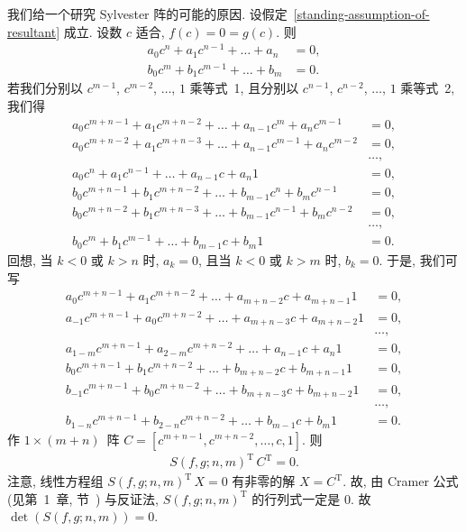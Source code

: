 \documentclass[../libro.tex]{subfiles}
\begin{document}
我们给一个研究 Sylvester 阵的可能的原因.
设假定~\ref{standing-assumption-of-resultant} 成立.
设数 \(c\) 适合, \(f(c) = 0 = g(c)\).
则
\begin{align*}
    a_0 c^n + a_1 c^{n-1} + \dots + a_n & = 0, \\
    b_0 c^m + b_1 c^{m-1} + \dots + b_m & = 0.
\end{align*}
若我们分别以 \(c^{m-1}\), \(c^{m-2}\), \(\dots\), \(1\) 乘等式~1,
且分别以 \(c^{n-1}\), \(c^{n-2}\), \(\dots\), \(1\) 乘等式~2,
我们得
\begin{align*}
    a_0 c^{m+n-1} + a_1 c^{m+n-2} + \dots + a_{n-1} c^{m} + a_n c^{m-1}   & = 0,   \\
    a_0 c^{m+n-2} + a_1 c^{m+n-3} + \dots + a_{n-1} c^{m-1} + a_n c^{m-2} & = 0,   \\
    & \dots, \\
    a_0 c^{n} + a_1 c^{n-1} + \dots + a_{n-1} c + a_n 1                   & = 0,   \\
    b_0 c^{m+n-1} + b_1 c^{m+n-2} + \dots + b_{m-1} c^{n} + b_m c^{n-1}   & = 0,   \\
    b_0 c^{m+n-2} + b_1 c^{m+n-3} + \dots + b_{m-1} c^{n-1} + b_m c^{n-2} & = 0,   \\
    & \dots, \\
    b_0 c^{m} + b_1 c^{m-1} + \dots + b_{m-1} c + b_m 1                   & = 0.
\end{align*}
回想, 当 \(k < 0\) 或 \(k > n\) 时, \(a_k = 0\),
且当 \(k < 0\) 或 \(k > m\) 时, \(b_k = 0\).
于是, 我们可写
\begin{align*}
    a_{0} c^{m+n-1} + a_{1} c^{m+n-2} + \dots + a_{m+n-2} c + a_{m+n-1} 1  & = 0,   \\
    a_{-1} c^{m+n-1} + a_{0} c^{m+n-2} + \dots + a_{m+n-3} c + a_{m+n-2} 1 & = 0,   \\
    & \dots, \\
    a_{1-m} c^{m+n-1} + a_{2-m} c^{m+n-2} + \dots + a_{n-1} c + a_{n} 1    & = 0,   \\
    b_{0} c^{m+n-1} + b_{1} c^{m+n-2} + \dots + b_{m+n-2} c + b_{m+n-1} 1  & = 0,   \\
    b_{-1} c^{m+n-1} + b_{0} c^{m+n-2} + \dots + b_{m+n-3} c + b_{m+n-2} 1 & = 0,   \\
    & \dots, \\
    b_{1-n} c^{m+n-1} + b_{2-n} c^{m+n-2} + \dots + b_{m-1} c + b_{m} 1    & = 0.
\end{align*}
作 \(1 \times (m + n)\)~阵
\(C = [c^{m+n-1}, c^{m+n-2}, \dots, c, 1]\).
则
\begin{align*}
    S(f, g; n, m)^{\mathrm{T}}\, C^{\mathrm{T}} = 0.
\end{align*}
注意, 线性方程组
\(S(f, g; n, m)^{\mathrm{T}}\, X = 0\)
有非零的解 \(X = C^{\mathrm{T}}\).
故, 由 Cramer 公式 (见第~1~章, 节~)
与反证法,
\(S(f, g; n, m)^{\mathrm{T}}\) 的行列式一定是 \(0\).
故 \(\det {(S(f, g; n, m))} = 0\).
\end{document}
